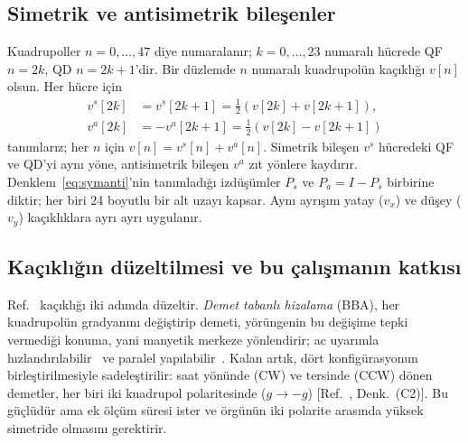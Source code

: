 \documentclass[11pt,a4paper]{article}
\begin{document}
\subsection{Simetrik ve antisimetrik bileşenler}
Kuadrupoller $n=0,\dots,47$ diye numaralanır; $k=0,\dots,23$ numaralı hücrede QF $n=2k$, QD $n=2k+1$'dir.
Bir düzlemde $n$ numaralı kuadrupolün kaçıklığı $v[n]$ olsun. Her hücre için
\begin{equation}
\begin{split}
v^s[2k]&=v^s[2k+1]=\tfrac12\left(v[2k]+v[2k+1]\right),\\
v^a[2k]&=-v^a[2k+1]=\tfrac12\left(v[2k]-v[2k+1]\right)
\end{split}
\label{eq:symanti}
\end{equation}
tanımlarız; her $n$ için $v[n]=v^s[n]+v^a[n]$. Simetrik bileşen $v^s$ hücredeki QF ve QD'yi aynı yöne,
antisimetrik bileşen $v^a$ zıt yönlere kaydırır. Denklem~\eqref{eq:symanti}'nin tanımladığı izdüşümler
$P_s$ ve $P_a=I-P_s$ birbirine diktir; her biri 24 boyutlu bir alt uzayı kapsar. Aynı ayrışım yatay ($v_x$)
ve düşey ($v_y$) kaçıklıklara ayrı ayrı uygulanır.

\subsection{Kaçıklığın düzeltilmesi ve bu çalışmanın katkısı}
Ref.~\cite{omarov} kaçıklığı iki adımda düzeltir. \emph{Demet tabanlı hizalama} (BBA), her kuadrupolün
gradyanını değiştirip demeti, yörüngenin bu değişime tepki vermediği konuma, yani manyetik merkeze yönlendirir;
ac uyarımla hızlandırılabilir~\cite{marti} ve paralel yapılabilir~\cite{huang}. Kalan artık, dört
konfigürasyonun birleştirilmesiyle sadeleştirilir: saat yönünde (CW) ve tersinde (CCW) dönen demetler, her
biri iki kuadrupol polaritesinde ($g\to-g$) [Ref.~\cite{omarov}, Denk.~(C2)]. Bu güçlüdür ama ek ölçüm
süresi ister ve örgünün iki polarite arasında yüksek simetride olmasını gerektirir.
\end{document}
